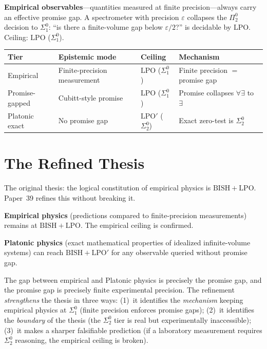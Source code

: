 \documentclass[11pt,a4paper]{report}
\theoremstyle{plain}
\theoremstyle{definition}
\theoremstyle{remark}
\newcommand{\BISH}{\mathrm{BISH}}
\newcommand{\LPO}{\mathrm{LPO}}
\begin{document}
\textbf{Empirical observables}---quantities measured at finite precision---always carry an effective promise gap. A spectrometer with precision $\varepsilon$ collapses the $\Pi^0_2$ decision to $\Sigma^0_1$: ``is there a finite-volume gap below $\varepsilon/2$?'' is decidable by $\LPO$. Ceiling: $\LPO$ ($\Sigma^0_1$).

\begin{center}
\begin{tabular}{@{}llll@{}}
\toprule
\textbf{Tier} & \textbf{Epistemic mode} & \textbf{Ceiling} & \textbf{Mechanism} \\
\midrule
Empirical & Finite-precision measurement & $\LPO$ ($\Sigma^0_1$) & Finite precision $=$ promise gap \\
Promise-gapped & Cubitt-style promise & $\LPO$ ($\Sigma^0_1$) & Promise collapses $\forall\exists$ to $\exists$ \\
Platonic exact & No promise gap & $\LPO'$ ($\Sigma^0_2$) & Exact zero-test is $\Sigma^0_2$ \\
\bottomrule
\end{tabular}
\end{center}

\section{The Refined Thesis}

The original thesis: the logical constitution of empirical physics is $\BISH+\LPO$. Paper~39 refines this without breaking it.

\textbf{Empirical physics} (predictions compared to finite-precision measurements) remains at $\BISH+\LPO$. The empirical ceiling is confirmed.

\textbf{Platonic physics} (exact mathematical properties of idealized infinite-volume systems) can reach $\BISH+\LPO'$ for any observable queried without promise gap.

The gap between empirical and Platonic physics is precisely the promise gap, and the promise gap is precisely finite experimental precision. The refinement \emph{strengthens} the thesis in three ways: (1)~it identifies the \emph{mechanism} keeping empirical physics at $\Sigma^0_1$ (finite precision enforces promise gaps); (2)~it identifies the \emph{boundary} of the thesis (the $\Sigma^0_2$ tier is real but experimentally inaccessible); (3)~it makes a sharper falsifiable prediction (if a laboratory measurement requires $\Sigma^0_2$ reasoning, the empirical ceiling is broken).
\end{document}

